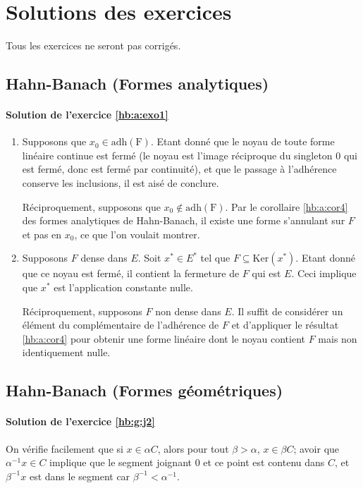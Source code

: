 \chapter{Solutions des exercices}
Tous les exercices ne seront pas corrigés.

\section{Hahn-Banach (Formes analytiques)}
\subsubsection*{Solution de l'exercice \ref{hb:a:exo1}}

\begin{enumerate}
\item Supposons que $x_0\in \mathrm{adh(F)}$.
  Etant donné que le noyau de toute forme linéaire
  continue est fermé (le noyau est l'image réciproque du singleton
  0 qui est fermé, donc est fermé par continuité), et que le passage
  à l'adhérence conserve les inclusions, il est aisé de conclure.

  Réciproquement, supposons que $x_0\notin \mathrm{adh(F)}$.
  Par le corollaire \ref{hb:a:cor4} des formes analytiques de
  Hahn-Banach, il existe une forme s'annulant sur $F$ et pas
  en $x_0$, ce que l'on voulait montrer.
\item Supposons $F$ dense dans $E$. Soit $x^*\in E^*$ tel
  que $F\subseteq\mathrm{Ker}(x^*)$. Etant donné que ce
  noyau est fermé, il contient la fermeture de $F$ qui
  est $E$. Ceci implique que $x^*$ est l'application
  constante nulle.

  Réciproquement, supposons $F$ non dense dans $E$.
  Il suffit de considérer un élément du complémentaire
  de l'adhérence de $F$ et d'appliquer le résultat \ref{hb:a:cor4}
  pour obtenir une forme linéaire dont le noyau contient
  $F$ mais non identiquement nulle.
\end{enumerate}

\section{Hahn-Banach (Formes géométriques)}
\subsubsection*{Solution de l'exercice \ref{hb:g:j2}}

On vérifie facilement que si $x\in \alpha C$, alors pour tout
$\beta >\alpha$, $x\in \beta C$;
avoir que $\alpha^{-1}x\in C$ implique que le segment joignant $0$ et ce
point est contenu dans $C$, et $\beta^{-1}x$ est dans le segment car
$\beta^{-1} <\alpha^{-1}$.

